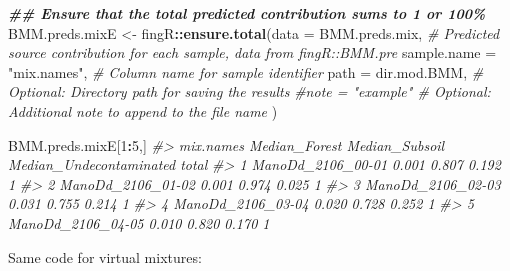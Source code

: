 \documentclass[
]{article}
\newenvironment{Shaded}{\begin{snugshade}}{\end{snugshade}}
\newcommand{\AttributeTok}[1]{\textcolor[rgb]{0.13,0.29,0.53}{#1}}
\newcommand{\CommentTok}[1]{\textcolor[rgb]{0.56,0.35,0.01}{\textit{#1}}}
\newcommand{\DecValTok}[1]{\textcolor[rgb]{0.00,0.00,0.81}{#1}}
\newcommand{\DocumentationTok}[1]{\textcolor[rgb]{0.56,0.35,0.01}{\textbf{\textit{#1}}}}
\newcommand{\FunctionTok}[1]{\textcolor[rgb]{0.13,0.29,0.53}{\textbf{#1}}}
\newcommand{\NormalTok}[1]{#1}
\newcommand{\OtherTok}[1]{\textcolor[rgb]{0.56,0.35,0.01}{#1}}
\newcommand{\SpecialCharTok}[1]{\textcolor[rgb]{0.81,0.36,0.00}{\textbf{#1}}}
\newcommand{\StringTok}[1]{\textcolor[rgb]{0.31,0.60,0.02}{#1}}
\begin{document}
\begin{Shaded}
\begin{Highlighting}[]
\DocumentationTok{\#\# Ensure that the total predicted contribution sums to 1 or 100\%}
\NormalTok{BMM.preds.mixE }\OtherTok{\textless{}{-}}\NormalTok{ fingR}\SpecialCharTok{::}\FunctionTok{ensure.total}\NormalTok{(}\AttributeTok{data =}\NormalTok{ BMM.preds.mix,      }\CommentTok{\# Predicted source contribution for each sample, data from fingR::BMM.pre}
                                      \AttributeTok{sample.name =} \StringTok{"mix.names"}\NormalTok{, }\CommentTok{\# Column name for sample identifier}
                                      \AttributeTok{path =}\NormalTok{ dir.mod.BMM,        }\CommentTok{\# Optional: Directory path for saving the results}
                                      \CommentTok{\#note = "example"          \# Optional: Additional note to append to the file name}
\NormalTok{                                      )}
\end{Highlighting}
\end{Shaded}

\begin{Shaded}
\begin{Highlighting}[]
\NormalTok{BMM.preds.mixE[}\DecValTok{1}\SpecialCharTok{:}\DecValTok{5}\NormalTok{,]}
\CommentTok{\#\textgreater{}           mix.names Median\_Forest Median\_Subsoil Median\_Undecontaminated total}
\CommentTok{\#\textgreater{} 1 ManoDd\_2106\_00{-}01         0.001          0.807                   0.192     1}
\CommentTok{\#\textgreater{} 2 ManoDd\_2106\_01{-}02         0.001          0.974                   0.025     1}
\CommentTok{\#\textgreater{} 3 ManoDd\_2106\_02{-}03         0.031          0.755                   0.214     1}
\CommentTok{\#\textgreater{} 4 ManoDd\_2106\_03{-}04         0.020          0.728                   0.252     1}
\CommentTok{\#\textgreater{} 5 ManoDd\_2106\_04{-}05         0.010          0.820                   0.170     1}
\end{Highlighting}
\end{Shaded}

Same code for virtual mixtures:
\end{document}
